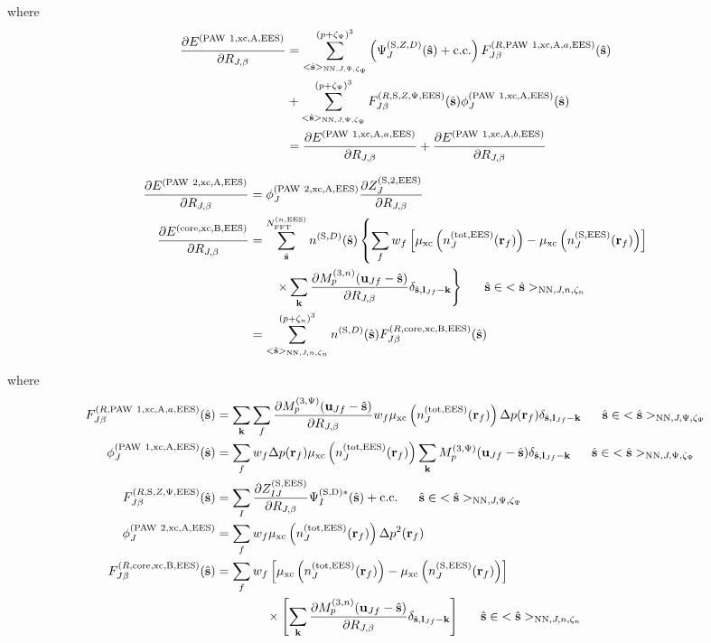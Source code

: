 \documentclass[paper=a4, fontsize=11pt]{article} %
\numberwithin{equation}{section} %
\numberwithin{figure}{section} %
\numberwithin{table}{section} %
\newcommand{\p}{\partial}
\newcommand{\bu}{{\bf{u}}}
\newcommand{\bl}{{\bf{l}}}
\newcommand{\bk}{{\bf{k}}}
\newcommand{\bs}{{\bf{s}}}
\newcommand{\br}{{\bf{r}}}
\newcommand{\hs}{{\hat{\bf{s}}}}
\newcommand{\rS}{{\mathrm{S}}}
\newcommand{\rEES}{{\mathrm{EES}}}
\newcommand{\rxc}{{\mathrm{xc}}}
\newcommand{\rcore}{{\mathrm{core}}}
\newcommand{\rNN}{{\mathrm{NN}}}
\newcommand{\rcc}{{\mathrm{c.c.}}}
\newcommand{\rP}{{\mathrm{PAW}}}
\newcommand{\rA}{{\mathrm{A}}}
\newcommand{\rB}{{\mathrm{B}}}
\newcommand{\rD}{{\mathrm{D}}}
\newcommand{\rtot}{{\mathrm{tot}}}
\newcommand{\RJb}{{R_{J,\beta}}}
\newcommand{\NFFTnEES}{{N^{(n,\rEES)}_{\mathrm{FFT}}}}
\newcommand{\Mn}{{M_p^{(3,n)}}}
\newcommand{\Mp}{{M_p^{(3,\Psi)}}}
\newcommand{\pzp}{{(p+\zeta_{\Psi})^3}}
\newcommand{\pzn}{{(p+\zeta_n)^3}}
\newcommand{\hsJp}{{<\hs>_{\rNN,J,\Psi,\zeta_\Psi}}}
\newcommand{\hsJn}{{<\hs>_{\rNN,J,n,\zeta_n}}}
\newcommand{\hsinJp}{{\ \ \ \ \ \hs  \in  \hsJp}}
\newcommand{\hsinJn}{{\ \ \ \ \ \hs  \in  \hsJn}}
\begin{document}
where
\begin{equation}
\begin{split}
\frac{\p E^{(\rP\ 1,\rxc,\rA,\rEES)}}{\p \RJb}
&= \sum_{\hsJp}^{\pzp} \left(\Psi_J^{(\rS,Z,D)}(\hat \bs)+ \rcc\right) F_{J\beta}^{(R,\rP\ 1,\rxc,\rA,a,\rEES)}(\hs) \\
&+ \sum_{\hsJp}^{\pzp} F_{J\beta}^{(R,\rS,Z,\Psi,\rEES)}(\hs) \phi_J^{(\rP\ 1,\rxc,\rA,\rEES)}(\hs) \\
&= \frac{\p E^{(\rP\ 1,\rxc,\rA,a,\rEES)}}{\p \RJb} + \frac{\p E^{(\rP\ 1,\rxc,\rA,b,\rEES)}}{\p \RJb}
\end{split}
\end{equation}



\begin{equation}
\begin{split}
\frac{\p E^{(\rP\ 2,\rxc,\rA,\rEES)}}{\p \RJb}
&= \phi_J^{(\rP\ 2,\rxc,\rA,\rEES)}\frac{\p Z_{J}^{(\rS,2,\rEES)}}{\p \RJb} \\
\frac{\p E^{(\rcore,\rxc,\rB,\rEES)}}{\p \RJb}
&=\sum_{\hat \bs}^{\NFFTnEES} n^{(\rS,D)}(\hat \bs) \left\{\sum_f w_f \left[\mu_{\rxc} \left(  n^{(\rtot,\rEES)}_J(\br_f)  \right) - \mu_{\rxc} \left(  n^{(\rS,\rEES)}_J(\br_f)  \right) \right]\right.\\
&\left.\ \ \ \ \ \ \times \sum_{\bk} \frac{\p \Mn(\bu_{Jf}-\hat \bs)}{\p \RJb}\delta_{\hat \bs,\bl_{Jf}-\bk} \right\} \hsinJn\\
&=\sum_{\hsJn}^{\pzn} n^{(\rS,D)}(\hat \bs) F_{J\beta}^{(R,\rcore,\rxc,\rB,\rEES)}(\hs)\\
\end{split}
\end{equation}



where
\begin{equation}\label{eq:dExccoredRwhere}
\begin{split}
F_{J\beta}^{(R,\rP\ 1,\rxc,\rA,a,\rEES)}(\hs)
&=\sum_{\bk}\sum_f  \frac{\p \Mp(\bu_{Jf}-\hat \bs)}{\p \RJb}w_f \mu_{\rxc} \left( n^{(\rtot,\rEES)}_J(\br_f)  \right)\Delta p(\br_f)\delta_{\hat \bs,\bl_{Jf}-\bk} \hsinJp \\
\phi_J^{(\rP\ 1,\rxc,\rA,\rEES)}(\hs) &= \sum_f w_f \Delta p(\br_f) \mu_{\rxc}\left(n_J^{(\rtot,\rEES)}(\br_f)\right)  \sum_{\bk} \Mp(\bu_{Jf}-\hat \bs)\delta_{\hat \bs,\bl_{Jf}-\bk} \hsinJp \\
F_{J\beta}^{(R,\rS,Z,\Psi,\rEES)}(\hs) &= \sum_I \frac{\p Z_{IJ}^{(\rS,\rEES)}}{\p \RJb}\Psi_I^{(\rS,\rD)*}(\hat \bs) + \rcc \hsinJp\\
\phi_J^{(\rP\ 2,\rxc,\rA,\rEES)} &= \sum_f w_f \mu_{\rxc} \left(  n^{(\rtot,\rEES)}_J(\br_f)  \right)\Delta p^2(\br_f) \\
F_{J\beta}^{(R,\rcore,\rxc,\rB,\rEES)}(\hs)&=\sum_f w_f \left[\mu_{\rxc} \left(  n^{(\rtot,\rEES)}_J(\br_f)  \right) - \mu_{\rxc} \left(  n^{(\rS,\rEES)}_J(\br_f)  \right) \right] \\
&\ \ \ \ \ \ \ \ \ \ \ \ \times \left[\sum_{\bk} \frac{\p \Mn(\bu_{Jf}-\hat \bs)}{\p \RJb}\delta_{\hat \bs,\bl_{Jf}-\bk} \right]\hsinJn \\
\end{split}
\end{equation}
\end{document}

